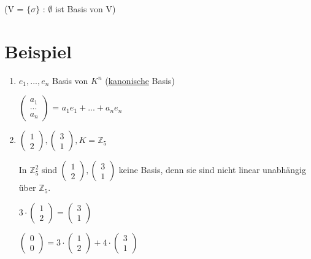 \documentclass[a4paper, openany]{book}
\begin{document}
    (V = $\{\sigma\}$ : $\emptyset$ ist Basis von V)

    \section{Beispiel}

    \begin{enumerate}[label=(\alph*)]
      \item $e_1, ..., e_n$ Basis von $K^n$ (\underline{kanonische} Basis)

      $\begin{pmatrix}a_1 \\ ... \\ a_n \end{pmatrix}$ = $a_1e_1+...+a_ne_n$

      \item $\begin{pmatrix}1 \\ 2 \end{pmatrix}, \begin{pmatrix}3 \\ 1 \end{pmatrix}, K = \mathbb{Z}_5$

      In $\mathbb{Z}_5^2$ sind $\begin{pmatrix}1 \\ 2 \end{pmatrix}, \begin{pmatrix}3 \\ 1 \end{pmatrix}$ keine Basis, denn sie sind nicht linear unabhängig über $\mathbb{Z}_5$.

      $3 \cdot \begin{pmatrix}1 \\ 2 \end{pmatrix} = \begin{pmatrix}3 \\ 1 \end{pmatrix}$

      $\begin{pmatrix}0 \\ 0 \end{pmatrix} = 3 \cdot \begin{pmatrix}1 \\ 2 \end{pmatrix} + 4 \cdot \begin{pmatrix}3 \\ 1 \end{pmatrix}$


\end{enumerate}
\end{document}

